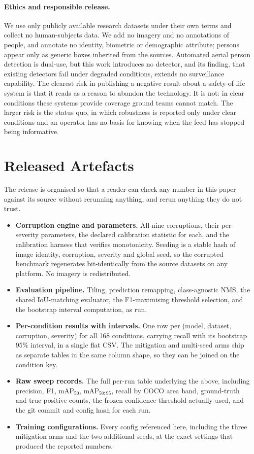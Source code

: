 \paragraph{Ethics and responsible release.} We use only publicly
available research datasets under their own terms and collect no
human-subjects data. We add no imagery and no annotations of people, and
annotate no identity, biometric or demographic attribute; persons appear
only as generic boxes inherited from the sources. Automated aerial
person detection is dual-use, but this work introduces no detector, and
its finding, that existing detectors fail under degraded conditions,
extends no surveillance capability. The clearest risk in publishing a
negative result about a safety-of-life system is that it reads as a
reason to abandon the technology. It is not: in clear conditions these
systems provide coverage ground teams cannot match. The larger risk is
the status quo, in which robustness is reported only under clear
conditions and an operator has no basis for knowing when the feed has
stopped being informative.

\section{Released Artefacts}
\label{sec:release}

The release is organised so that a reader can check any number in this
paper against its source without rerunning anything, and rerun anything
they do not trust.

\begin{itemize}\itemsep1pt \parskip0pt 
\item \textbf{Corruption engine and parameters.} All nine corruptions,
their per-severity parameters, the declared calibration statistic for
each, and the calibration harness that verifies monotonicity. Seeding is
a stable hash of image identity, corruption, severity and global seed,
so the corrupted benchmark regenerates bit-identically from the source
datasets on any platform. No imagery is redistributed.
\item \textbf{Evaluation pipeline.} Tiling, prediction remapping,
class-agnostic NMS, the shared IoU-matching evaluator, the
F1-maximising threshold selection, and the bootstrap interval
computation, as run.
\item \textbf{Per-condition results with intervals.} One row per
(model, dataset, corruption, severity) for all 168 conditions, carrying
recall with its bootstrap 95\% interval, in a single flat CSV. The
mitigation and multi-seed arms ship as separate tables in the same
column shape, so they can be joined on the condition key.
\item \textbf{Raw sweep records.} The full per-run table underlying the
above, including precision, F1, mAP$_{50}$, mAP$_{50:95}$, recall by
COCO area band, ground-truth and true-positive counts, the frozen
confidence threshold actually used, and the git commit and config hash
for each run.
\item \textbf{Training configurations.} Every config referenced here,
including the three mitigation arms and the two additional seeds, at the
exact settings that produced the reported numbers.
\end{itemize}

